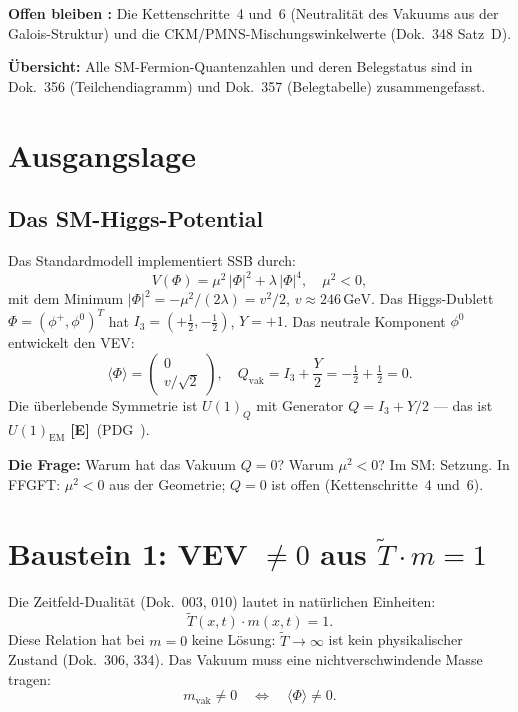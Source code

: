\textbf{Offen bleiben \SM:} Die Kettenschritte~4 und~6 (Neutralität des
Vakuums aus der Galois-Struktur) und die CKM/PMNS-Mischungswinkelwerte
(Dok.~348 Satz~D).

\textbf{Übersicht:} Alle SM-Fermion-Quantenzahlen und deren Belegstatus
sind in Dok.~356 (Teilchendiagramm) und Dok.~357 (Belegtabelle) zusammengefasst.

\section{Ausgangslage}

\subsection*{Das SM-Higgs-Potential}

Das Standardmodell implementiert SSB durch:
\begin{equation}
  V(\Phi) = \mu^2\,|\Phi|^2 + \lambda\,|\Phi|^4,
  \quad \mu^2 < 0,
  \label{eq:higgs_pot}
\end{equation}
mit dem Minimum $|\Phi|^2 = -\mu^2/(2\lambda) = v^2/2$, $v\approx246\,\text{GeV}$.
Das Higgs-Dublett $\Phi = (\phi^+,\phi^0)^T$ hat $I_3 = (+\tfrac{1}{2},-\tfrac{1}{2})$,
$Y = +1$. Das
neutrale Komponent $\phi^0$ entwickelt den VEV:
\begin{equation}
  \langle\Phi\rangle = \begin{pmatrix}0\\v/\sqrt{2}\end{pmatrix},
  \quad Q_\text{vak} = I_3 + \frac{Y}{2} = -\tfrac{1}{2}+\tfrac{1}{2} = 0.
  \label{eq:sm_vev}
\end{equation}
Die überlebende Symmetrie ist $U(1)_Q$ mit Generator $Q=I_3+Y/2$ ---
das ist $U(1)_\text{EM}$ \textbf{[E]}\ (PDG~\QM).

\textbf{Die Frage:} Warum hat das Vakuum $Q=0$? Warum $\mu^2<0$?
Im SM: Setzung. In FFGFT: $\mu^2<0$ aus der Geometrie; $Q=0$ ist offen
(Kettenschritte~4 und~6).

\section{Baustein 1: VEV $\neq 0$ aus $\tilde{T}\cdot m = 1$}

Die Zeitfeld-Dualität (Dok.~003, 010) lautet in natürlichen Einheiten:
\begin{equation}
  \tilde{T}(x,t)\cdot m(x,t) = 1.
  \label{eq:tm1}
\end{equation}
Diese Relation hat bei $m=0$ keine Lösung: $\tilde{T}\to\infty$ ist
kein physikalischer Zustand (Dok.~306, 334). Das Vakuum muss eine
nichtverschwindende Masse tragen:
\begin{equation}
  m_\text{vak} \neq 0 \quad\Longleftrightarrow\quad \langle\Phi\rangle \neq 0.
  \label{eq:vev_nonzero}
\end{equation}

